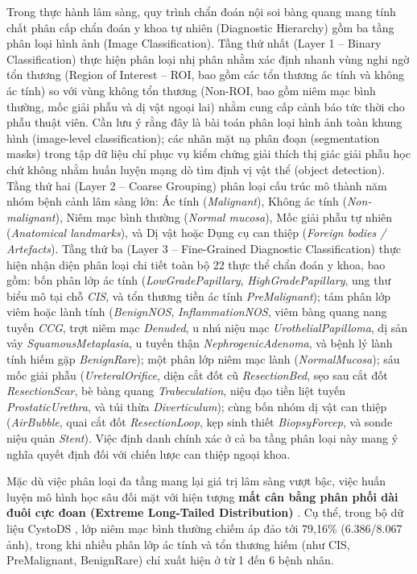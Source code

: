 \documentclass[runningheads]{llncs}
\begin{document}
Trong thực hành lâm sàng, quy trình chẩn đoán nội soi bàng quang mang tính chất phân cấp chẩn đoán y khoa tự nhiên (Diagnostic Hierarchy) gồm ba tầng phân loại hình ảnh (Image Classification). Tầng thứ nhất (Layer 1 -- Binary Classification) thực hiện phân loại nhị phân nhằm xác định nhanh vùng nghi ngờ tổn thương (Region of Interest -- ROI, bao gồm các tổn thương ác tính và không ác tính) so với vùng không tổn thương (Non-ROI, bao gồm niêm mạc bình thường, mốc giải phẫu và dị vật ngoại lai) nhằm cung cấp cảnh báo tức thời cho phẫu thuật viên. Cần lưu ý rằng đây là bài toán phân loại hình ảnh toàn khung hình (image-level classification); các nhãn mặt nạ phân đoạn (segmentation masks) trong tập dữ liệu chỉ phục vụ kiểm chứng giải thích thị giác giải phẫu học chứ không nhằm huấn luyện mạng dò tìm định vị vật thể (object detection). Tầng thứ hai (Layer 2 -- Coarse Grouping) phân loại cấu trúc mô thành năm nhóm bệnh cảnh lâm sàng lớn: Ác tính (\textit{Malignant}), Không ác tính (\textit{Non-malignant}), Niêm mạc bình thường (\textit{Normal mucosa}), Mốc giải phẫu tự nhiên (\textit{Anatomical landmarks}), và Dị vật hoặc Dụng cụ can thiệp (\textit{Foreign bodies / Artefacts}). Tầng thứ ba (Layer 3 -- Fine-Grained Diagnostic Classification) thực hiện nhận diện phân loại chi tiết toàn bộ 22 thực thể chẩn đoán y khoa, bao gồm: bốn phân lớp ác tính (\textit{LowGradePapillary}, \textit{HighGradePapillary}, ung thư biểu mô tại chỗ \textit{CIS}, và tổn thương tiền ác tính \textit{PreMalignant}); tám phân lớp viêm hoặc lành tính (\textit{BenignNOS}, \textit{InflammationNOS}, viêm bàng quang nang tuyến \textit{CCG}, trợt niêm mạc \textit{Denuded}, u nhú niệu mạc \textit{UrothelialPapilloma}, dị sản vảy \textit{SquamousMetaplasia}, u tuyến thận \textit{NephrogenicAdenoma}, và bệnh lý lành tính hiếm gặp \textit{BenignRare}); một phân lớp niêm mạc lành (\textit{NormalMucosa}); sáu mốc giải phẫu (\textit{UreteralOrifice}, diện cắt đốt cũ \textit{ResectionBed}, sẹo sau cắt đốt \textit{ResectionScar}, bè bàng quang \textit{Trabeculation}, niệu đạo tiền liệt tuyến \textit{ProstaticUrethra}, và túi thừa \textit{Diverticulum}); cùng bốn nhóm dị vật can thiệp (\textit{AirBubble}, quai cắt đốt \textit{ResectionLoop}, kẹp sinh thiết \textit{BiopsyForcep}, và sonde niệu quản \textit{Stent}). Việc định danh chính xác ở cả ba tầng phân loại này mang ý nghĩa quyết định đối với chiến lược can thiệp ngoại khoa.

Mặc dù việc phân loại đa tầng mang lại giá trị lâm sàng vượt bậc, việc huấn luyện mô hình học sâu đối mặt với hiện tượng \textbf{mất cân bằng phân phối dài đuôi cực đoan (Extreme Long-Tailed Distribution)} \cite{ref_lee2026cystods}. Cụ thể, trong bộ dữ liệu CystoDS \cite{ref_lee2026cystods}, lớp niêm mạc bình thường chiếm áp đảo tới 79,16\% (6.386/8.067 ảnh), trong khi nhiều phân lớp ác tính và tổn thương hiếm (như CIS, PreMalignant, BenignRare) chỉ xuất hiện ở từ 1 đến 6 bệnh nhân.
\end{document}
